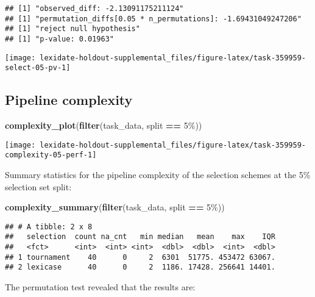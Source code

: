 \documentclass[
]{book}
\newenvironment{Shaded}{\begin{snugshade}}{\end{snugshade}}
\newcommand{\FunctionTok}[1]{\textcolor[rgb]{0.13,0.29,0.53}{\textbf{#1}}}
\newcommand{\NormalTok}[1]{#1}
\newcommand{\SpecialCharTok}[1]{\textcolor[rgb]{0.81,0.36,0.00}{\textbf{#1}}}
\newcommand{\StringTok}[1]{\textcolor[rgb]{0.31,0.60,0.02}{#1}}
\begin{document}
\begin{verbatim}
## [1] "observed_diff: -2.13091175211124"
## [1] "permutation_diffs[0.05 * n_permutations]: -1.69431049247206"
## [1] "reject null hypothesis"
## [1] "p-value: 0.01963"
\end{verbatim}

\texttt{[image: lexidate-holdout-supplemental\_files/figure-latex/task-359959-select-05-pv-1]}

\hypertarget{pipeline-complexity-33}{%
\subsection{Pipeline complexity}\label{pipeline-complexity-33}}

\begin{Shaded}
\begin{Highlighting}[]
\FunctionTok{complexity\_plot}\NormalTok{(}\FunctionTok{filter}\NormalTok{(task\_data, split }\SpecialCharTok{==} \StringTok{\textquotesingle{}5\%\textquotesingle{}}\NormalTok{))}
\end{Highlighting}
\end{Shaded}

\texttt{[image: lexidate-holdout-supplemental\_files/figure-latex/task-359959-complexity-05-perf-1]}

Summary statistics for the pipeline complexity of the selection schemes at the 5\% selection set split:

\begin{Shaded}
\begin{Highlighting}[]
\FunctionTok{complexity\_summary}\NormalTok{(}\FunctionTok{filter}\NormalTok{(task\_data, split }\SpecialCharTok{==} \StringTok{\textquotesingle{}5\%\textquotesingle{}}\NormalTok{))}
\end{Highlighting}
\end{Shaded}

\begin{verbatim}
## # A tibble: 2 x 8
##   selection  count na_cnt   min median   mean    max    IQR
##   <fct>      <int>  <int> <int>  <dbl>  <dbl>  <int>  <dbl>
## 1 tournament    40      0     2  6301  51775. 453472 63067.
## 2 lexicase      40      0     2  1186. 17428. 256641 14401.
\end{verbatim}

The permutation test revealed that the results are:
\end{document}
